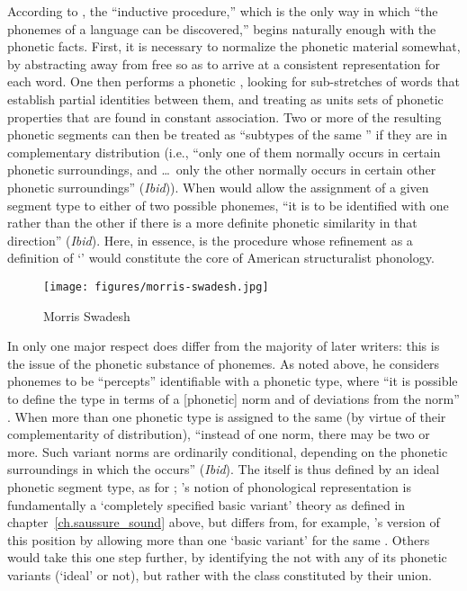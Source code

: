 According to \citet[123]{swadesh34:phoneme}, the ``inductive
procedure,'' which is the only way in which ``the phonemes of a
language can be discovered,'' begins naturally enough with the
phonetic facts. First, it is necessary to normalize the phonetic
material somewhat, by abstracting away from free  so as to
arrive at a consistent representation for each word. One then performs
a phonetic , looking for sub-stretches of words that
establish partial identities between them, and treating as units sets
of phonetic properties that are found in constant association. Two or
more of the resulting phonetic segments can then be treated as
``subtypes of the same '' if they are in complementary
distribution (i.e., ``only one of them normally occurs in certain
phonetic surroundings, and \ldots\ only the other normally occurs in
certain other phonetic surroundings'' (\emph{Ibid})). When
 would allow the assignment of a given
segment type to either of two possible phonemes, ``it is to be
identified with one rather than the other if there is a more definite
phonetic similarity in that direction'' (\emph{Ibid}). Here, in
essence, is the procedure whose refinement as a definition of
`' would constitute the core of American structuralist
phonology.

\begin{wrapfigure}{l}{.35\textwidth}
  \texttt{[image: figures/morris-swadesh.jpg]}
  \caption{Morris Swadesh}
  \label{fig:ch.structuralists.swadesh}
\end{wrapfigure}
In only one major respect does {\Swadesh} differ from the majority of
later writers: this is the issue of the phonetic substance of
phonemes. As noted above, he considers phonemes to be ``percepts''
identifiable with a phonetic type, where ``it is possible to define
the type in terms of a [phonetic] norm and of deviations from the
norm'' \citep[119]{swadesh34:phoneme}. When more than one phonetic
type is assigned to the same  (by virtue of their
complementarity of distribution), ``instead of one norm, there may be
two or more. Such variant norms are ordinarily conditional, depending
on the phonetic surroundings in which the  occurs''
(\emph{Ibid}). The  itself is thus defined by an ideal phonetic
segment type, as for {\Sapir}; {\Swadesh}'s notion of phonological
representation is fundamentally a `completely specified basic variant'
theory as defined in chapter~\ref{ch.saussure_sound} above, but
differs from, for example, {\Sapir}'s version of this position by
allowing more than one `basic variant' for the same . Others
would take this one step further, by identifying the  not with
any of its phonetic variants (`ideal' or not), but rather with the
class constituted by their union.

